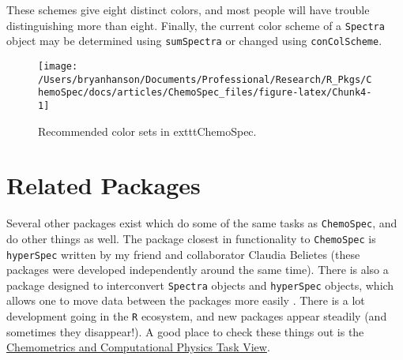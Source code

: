 \documentclass[letter,10pt,twocolumn,twoside,printwatermark=false]{pinp}
\begin{document}
These schemes give eight distinct colors, and most people will have
trouble distinguishing more than eight. Finally, the current color
scheme of a \texttt{Spectra} object may be determined using
\texttt{sumSpectra} or changed using \texttt{conColScheme}.

\begin{figure}

{\centering \texttt{[image: /Users/bryanhanson/Documents/Professional/Research/R\_Pkgs/ChemoSpec/docs/articles/ChemoSpec\_files/figure-latex/Chunk4-1]} 

}

\caption{\label{colors}Recommended color sets in    exttt{ChemoSpec}.}\label{fig:Chunk4}
\end{figure}

\hypertarget{related-packages}{%
\section{Related Packages}\label{related-packages}}

Several other packages exist which do some of the same tasks as
\texttt{ChemoSpec}, and do other things as well. The package closest in
functionality to \texttt{ChemoSpec} is \texttt{hyperSpec} written by my
friend and collaborator Claudia Belietes (these packages were developed
independently around the same time).\citep{Beleites2018} There is also a
package designed to interconvert \texttt{Spectra} objects and
\texttt{hyperSpec} objects, which allows one to move data between the
packages more easily \citep{HansonMcManus2018}. There is a lot
development going in the \texttt{R} ecosystem, and new packages appear
steadily (and sometimes they disappear!). A good place to check these
things out is the
\href{http://cran.at.r-project.org/web/views/ChemPhys.html}{Chemometrics and Computational Physics Task View}.

\showacknow

\pnasbreak 



\end{document}

